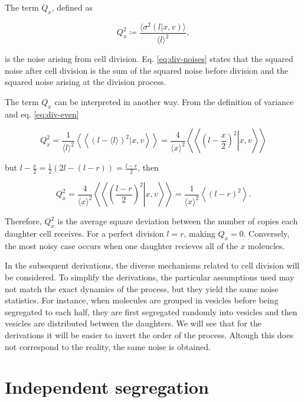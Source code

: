 The term $Q_x$, defined as

\begin{equation}
  \label{eq:div-Q}
  Q_x^2 \coloneqq \frac{\langle\sigma^2(l|x,v)\rangle}{\langle l\rangle^2},
\end{equation}

is the noise arising from cell division. Eq. \eqref{eq:div-noises} states that the squared noise after cell division is the sum of the squared noise before division and the squared noise arising at the division process.

The term $Q_x$ can be interpreted in another way. From the definition of variance and eq. \eqref{eq:div-even}

\begin{equation*}
  Q_x^2 = \frac{1}{\langle l\rangle^2}\left\langle\left\langle\left(l-\langle l\rangle\right)^2|x,v\right\rangle\right\rangle = \frac{4}{\langle x\rangle^2}\left\langle\left\langle\left.\left(l-\frac{x}{2}\right)^2\right|x,v\right\rangle\right\rangle
\end{equation*}

but $l - \frac{x}{2} = \frac{1}{2}(2l-(l-r)) = \frac{l-r}{2}$, then

\begin{equation*}
   Q_x^2 = \frac{4}{\langle x\rangle^2}\left\langle\left\langle\left.\left(\frac{l-r}{2}\right)^2\right|x,v\right\rangle\right\rangle  = \frac{1}{\langle x\rangle^2}\left\langle\left(l-r\right)^2\right\rangle.
\end{equation*}

Therefore, $Q_x^2$ is the average square deviation between the number of copies each daughter cell receives. For a perfect division $l=r$, making $Q_x=0$. Conversely, the most noisy case occurs when one daughter recieves all of the $x$ moleucles.

In the subsequent derivations, the diverse mechanisms related to cell division will be considered. To simplify the derivations, the particular assumptions used may not match the exact dynamics of the process, but they yield the same noise statistics. For instance, when molecules are grouped in vesicles before being segregated to each half, they are first segregated randomly into vesicles and then vesicles are distributed between the daughters. We will see that for the derivations it will be easier to invert the order of the process. Altough this does not correspond to the reality, the same noise is obtained.

\section{Independent segregation}

